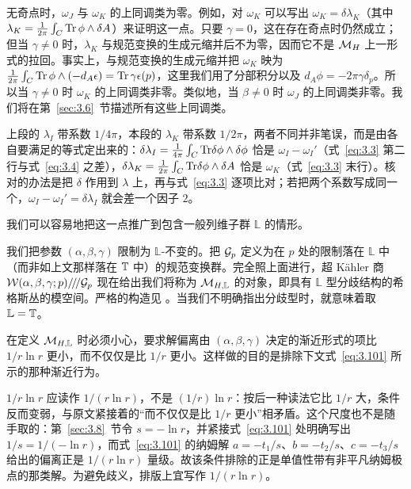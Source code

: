 无奇点时，$\omega_J$ 与 $\omega_K$ 的上同调类为零。例如，对 $\omega_K$ 可以写出 $\omega_K=\delta\lambda_K$（其中 $\lambda_K={1\over 2\pi}\int_C{\rm Tr} \,\phi\wedge\delta A$）来证明这一点。只要 $\gamma=0$，这在存在奇点时仍然成立；但当 $\gamma\not=0$ 时，$\lambda_K$ 与规范变换的生成元缩并后不为零，因而它不是 ${{\mathcal{M}}_H}$ 上一形式的拉回。事实上，与规范变换的生成元缩并把 $\omega_K$ 映为 ${1\over
2\pi}\int_C{\rm Tr}\,\phi\wedge (-d_A\epsilon)= {\rm Tr}\,\gamma \epsilon(p)$，这里我们用了分部积分以及 $d_A\phi=-2\pi \gamma \delta_p$。所以当 $\gamma\not=0$ 时 $\omega_K$ 的上同调类非零。类似地，当 $\beta\not=0$ 时 $\omega_J$ 的上同调类非零。我们将在第~\ref{sec:3.6}~节描述所有这些上同调类。

\begin{yizhu}[易错点]
上段的 $\lambda_I$ 带系数 $1/4\pi$，本段的 $\lambda_K$ 带系数 $1/2\pi$，两者不同并非笔误，而是由各自要满足的等式定出来的：$\delta\lambda_I={1\over 4\pi}\int_C{\rm Tr}\delta\phi\wedge\delta\phi$ 恰是 $\omega_I-\omega_I'$（式~\eqref{eq:3.3} 第二行与式~\eqref{eq:3.4} 之差），$\delta\lambda_K={1\over 2\pi}\int_C{\rm Tr}\delta\phi\wedge\delta A$ 恰是 $\omega_K$（式~\eqref{eq:3.3} 末行）。核对的办法是把 $\delta$ 作用到 $\lambda$ 上，再与式~\eqref{eq:3.3} 逐项比对；若把两个系数写成同一个，$\omega_I-\omega_I'=\delta\lambda_I$ 就会差一个因子 $2$。
\end{yizhu}

\bigskip{}

我们可以容易地把这一点推广到包含一般列维子群 $\mathbb{L}$ 的情形。

我们把参数 $(\alpha,\beta,\gamma)$ 限制为 $\mathbb{L}$-不变的。把 $\mathcal{G}_p$ 定义为在 $p$ 处的限制落在 $\mathbb{L}$ 中（而非如上文那样落在 ${\mathbb{T}}$ 中）的规范变换群。完全照上面进行，超 Kähler 商 $\mathcal{W}(\alpha,\beta,\gamma;p)/\negthinspace/\negthinspace/\mathcal{G}_p$
现在给出我们将称为 ${\mathcal{M}}_{H,\mathbb{L}}$ 的对象，即具有 $\mathbb{L}$ 型分歧结构的希格斯丛的模空间。严格的构造见 \cite{ref23}。当我们不明确指出分歧型时，就意味着取 $\mathbb{L}={\mathbb{T}}$。

在定义 ${\mathcal{M}}_{H,\mathbb{L}}$ 时必须小心，要求解偏离由 $(\alpha,\beta,\gamma)$ 决定的渐近形式的项比 $1/r\ln r$ 更小，而不仅仅是比 $1/r$ 更小。这样做的目的是排除下文式~\eqref{eq:3.101} 所示的那种渐近行为。

\begin{yizhu}[易错点]
$1/r\ln r$ 应读作 $1/(r\ln r)$，不是 $(1/r)\ln r$：按后一种读法它比 $1/r$ 大，条件反而变弱，与原文紧接着的“而不仅仅是比 $1/r$ 更小”相矛盾。这个尺度也不是随手取的：第~\ref{sec:3.8}~节令 $s=-\ln r$，并紧接式~\eqref{eq:3.101} 处明确写出 $1/s=1/(-\ln r)$，而式~\eqref{eq:3.101} 的纳姆解 $a=-t_1/s$、$b=-t_2/s$、$c=-t_3/s$ 给出的偏离正是 $1/(r\ln r)$ 量级。故该条件排除的正是单值性带有非平凡纳姆极点的那类解。为避免歧义，排版上宜写作 $1/(r\ln r)$。
\end{yizhu}

